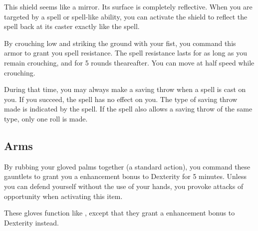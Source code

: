 
 This shield seems like a mirror. Its surface is completely reflective. When you are targeted by a spell or spell-like ability, you can activate the shield to reflect the spell back at its caster exactly like the  spell.


 By crouching low and striking the ground with your fist, you command this armor to grant you spell resistance. The spell resistance lasts for as long as you remain crouching, and for 5 rounds theareafter. You can move at half speed while crouching.

During that time, you may always make a saving throw when a spell is cast on you. If you succeed, the spell has no effect on you. The type of saving throw made is indicated by the spell. If the spell also allows a saving throw of the same type, only one roll is made.


\subsection{Arms}

 By rubbing your gloved palms together (a standard action), you command these gauntlets to grant you a  enhancement bonus to Dexterity for 5 minutes. Unless you can defend yourself without the use of your hands, you provoke attacks of opportunity when activating this item.


 These gloves function like , except that they grant a  enhancement bonus to Dexterity instead.


